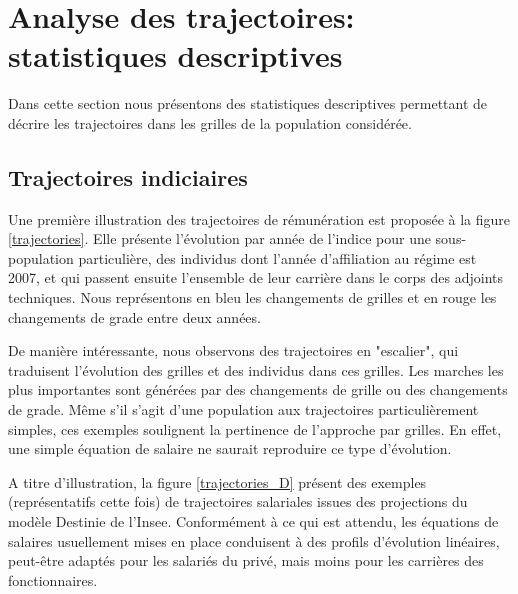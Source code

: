 \documentclass[11pt,a4paper]{article}
\begin{document}
\section{Analyse des trajectoires: statistiques descriptives}

Dans cette section nous présentons des statistiques descriptives permettant de décrire les trajectoires dans les grilles de la population considérée. 

\subsection{Trajectoires indiciaires}

Une première illustration des trajectoires de rémunération est proposée à la figure \ref{trajectories}. Elle présente l'évolution par année de l'indice pour une sous-population particulière, des individus dont l'année d'affiliation au régime est 2007, et qui passent ensuite l'ensemble de leur carrière dans le corps des adjoints techniques. Nous représentons en bleu les changements de grilles et en rouge les changements de grade entre deux années. 

De manière intéressante, nous observons des trajectoires en "escalier", qui traduisent l'évolution des grilles et des individus dans ces grilles. Les marches les plus importantes sont générées par des changements de grille ou des changements de grade. Même s'il s'agit d'une population aux trajectoires particulièrement simples, ces exemples soulignent la pertinence de l'approche par grilles. En effet, une simple équation de salaire ne saurait reproduire ce type d'évolution. 

A titre d'illustration, la figure \ref{trajectories_D} présent des exemples (représentatifs cette fois) de trajectoires salariales issues des projections du modèle Destinie de l'Insee. Conformément à ce qui est attendu, les équations de salaires usuellement mises en place conduisent à des profils d'évolution linéaires, peut-être  adaptés pour les salariés du privé, mais moins pour les carrières des fonctionnaires. 
\end{document}
